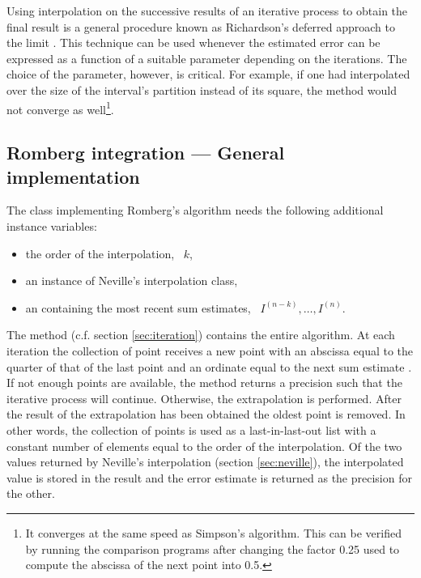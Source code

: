 Using interpolation on the successive results of an iterative
process to obtain the final result is a general procedure known as
Richardson's deferred approach to the limit \cite{Press}. This
technique can be used whenever the estimated error can be
expressed as a function of a suitable parameter depending on the
iterations. The choice of the parameter, however, is critical. For
example, if one had interpolated over the size of the interval's
partition instead of its square, the method would not converge as
well\footnote{It converges at the same speed as Simpson's
algorithm. This can be verified by running the comparison programs
after changing the factor 0.25 used to compute the abscissa of the
next point into 0.5.}.

\subsection{Romberg integration --- General implementation}
The class implementing Romberg's algorithm needs the following
additional instance variables:
\begin{itemize}
\item {} the order of the interpolation, \ie\ $k$,\\
\item {} an instance of Neville's interpolation class,\\
\item {} an  containing the most recent sum estimates,
\ie\ $I^{\left(n-k\right)},\ldots,I^{\left(n\right)}$.\\
\end{itemize}
The method  (c.f. section
\ref{sec:iteration}) contains the entire algorithm. At each
iteration the collection of point receives a new point with an
abscissa equal to the quarter of that of the last point and an
ordinate equal to the next sum estimate . If not enough points are
available, the method returns a precision such that the iterative
process will continue. Otherwise, the extrapolation is performed.
After the result of the extrapolation has been obtained the oldest
point is removed. In other words, the collection of points is used
as a last-in-last-out list with a constant number of elements
equal to the order of the interpolation. Of the two values
returned by Neville's interpolation (\cf section
\ref{sec:neville}), the interpolated value is stored in the result
and the error estimate is returned as the precision for the other.


